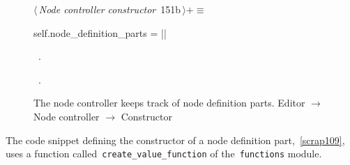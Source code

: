 \documentclass[%
    a4paper,    %
    justified,  %
    nobib,      %
    openany     %
]{tufte-book}
\makeatletter
\renewcommand{\label}[1]{\@tufte@label{##1}}%
\makeatother
\begin{document}
\begin{figure}[!htbp]
\begin{flushleft} \small
\begin{minipage}{\linewidth}\label{scrap110}\raggedright\small
{} $\langle\,${\itshape Node controller constructor}\nobreak\ {\footnotesize {151b}}$\,\rangle+\equiv$
\vspace{-1ex}
\begin{pythoncode}
    self.node_definition_parts = {}
|\NWsep|
\end{pythoncode}
\vspace{1.5ex}
\footnotesize
\begin{list}{}{\setlength{\itemsep}{-\parsep}\setlength{\itemindent}{-\leftmargin}}
\item \NWtxtMacroDefBy\ .
\item \NWtxtMacroRefIn\ .

\item{}
\end{list}
\end{minipage}\vspace{4ex}
\end{flushleft}
\caption{The node controller keeps track of node definition parts.
  \newline{}\newline{}Editor $\rightarrow$ Node controller $\rightarrow$
  Constructor}
\end{figure}

The code snippet defining the constructor of a node definition
part,~\cref{scrap109}, uses a function
called~\verb=create_value_function= of the~\verb=functions= module.
\end{document}
